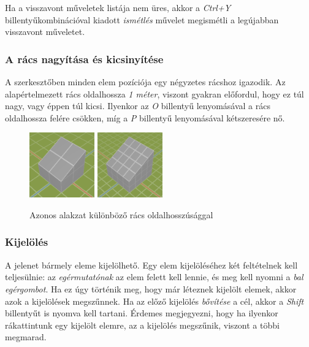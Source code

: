 Ha a visszavont műveletek listája nem üres, akkor a \emph{Ctrl+Y} billentyűkombinációval kiadott
\emph{ismétlés} művelet megismétli a legújabban visszavont műveletet.

\pagebreak

\subsubsection{A rács nagyítása és kicsinyítése}

A szerkesztőben minden elem pozíciója egy négyzetes rácshoz igazodik. Az alapértelmezett rács
oldalhossza \emph{1 méter}, viszont gyakran előfordul, hogy ez túl nagy, vagy éppen túl kicsi.
Ilyenkor az \emph{O} billentyű lenyomásával a rács oldalhossza felére csökken, míg a \emph{P}
billentyű lenyomásával kétszeresére nő.

\begin{figure}[h]
    \centering
    \includegraphics[width=0.25\textwidth]{parts/user-documentation/editor/images/grid_128.png}
    \includegraphics[width=0.25\textwidth]{parts/user-documentation/editor/images/grid_64.png}
    \caption{Azonos alakzat különböző rács oldalhosszúsággal}
\end{figure}

\subsubsection{Kijelölés}

A jelenet bármely eleme kijelölhető. Egy elem kijelöléséhez két feltételnek kell teljesülnie: az
\emph{egérmutatónak} az elem felett kell lennie, és meg kell nyomni a \emph{bal egérgombot}. Ha ez
úgy történik meg, hogy már léteznek kijelölt elemek, akkor azok a kijelölések megszűnnek. Ha az
előző kijelölés \emph{bővítése} a cél, akkor a \emph{Shift} billentyűt is nyomva kell tartani.
Érdemes megjegyezni, hogy ha ilyenkor rákattintunk egy kijelölt elemre, az a kijelölés megszűnik,
viszont a többi megmarad.

